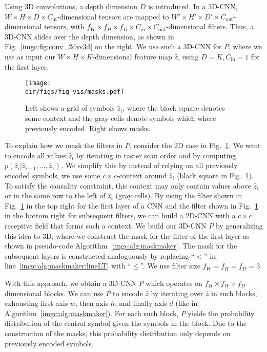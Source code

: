 \begin{subappendices}
Using 3D convolutions, a depth dimension $D$ is introduced. In a 3D-CNN, $W \times H \times D \times C_\text{in}$-dimensional tensors are mapped to $W' \times H' \times D' \times C_\text{out}$-dimensional tensors, with $f_W \times f_H \times f_D \times C_\text{in} \times C_\text{out}$-dimensional filters. Thus, a 3D-CNN slides over the depth dimension, as shown in Fig.~\ref{imgc:fig:conv_2dvs3d} on the right. We use such a 3D-CNN for $P$, where we use as input our $W \times H \times K$-dimensional feature map $\hat z$, using $D=K, C_\text{in} = 1$ for the first layer.

\begin{figure}
\centering
\texttt{[image: \\dir/figs/fig\_vis/masks.pdf]}
\caption{Left shows a grid of symbols $\hat z_i$, where the black square denotes some context and the gray cells denote symbols which where previously encoded. Right shows masks.}
\label{imgc:fig:masks}
\end{figure}

To explain how we mask the filters in $P$, consider the 2D case in Fig.~\ref{imgc:fig:masks}. We want to encode all values $\hat z_i$ by iterating in raster scan order and by computing $p(\hat z_i|\hat z_{i-1}, \dots, \hat z_1)$. We simplify this by instead of relying on all previously encoded symbols, we use some $c \times c$-context around $\hat z_i$ (black square in Fig.~\ref{imgc:fig:masks}). To satisfy the causality constraint, this context may only contain values above $\hat z_i$ or in the same row to the left of $\hat z_i$ (gray cells). By using the filter shown in Fig.~\ref{imgc:fig:masks} in the top right for the first layer of a CNN and the filter shown in Fig.~\ref{imgc:fig:masks} in the bottom right for subsequent filters, we can build a 2D-CNN with a $c \times c$ receptive field that forms such a context. We build our 3D-CNN $P$ by generalizing this idea to 3D, where we construct the mask for the filter of the first layer as shown in pseudo-code Algorithm~\ref{imgc:alg:maskmaker}. The mask for the subsequent layers is constructed analoguously by replacing ``$<$'' in line~\ref{imgc:alg:maskmaker:lineLT} with ``$\leq$''. We use filter size $f_W = f_H = f_D = 3$.

With this approach, we obtain a 3D-CNN $P$ which operates on $f_H \times f_W \times f_D$-dimensional blocks. We can use $P$ to encode $\hat z$ by iterating over $\hat z$ in such blocks, exhausting first axis $w$, then axis $h$, and finally axis $d$ (like in Algorithm~\ref{imgc:alg:maskmaker}). For each such block, $P$ yields the probability distribution of the central symbol given the symbols in the block. Due to the construction of the masks, this probability distribution only depends on previously encoded symbols. 



\end{subappendices}
